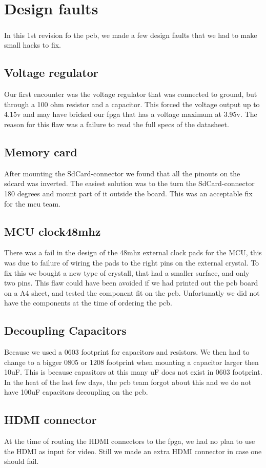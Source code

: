 \section{Design faults}
In this 1\textsuperscript{}st revision fo the pcb, we made a few design faults that we had to make small hacks to fix. 
\subsection{Voltage regulator}
Our first encounter was the voltage regulator that was connected to ground, but through a 100 ohm resistor and a capacitor. This forced the voltage output up to 4.15v and may have bricked our fpga that has a voltage maximum at 3.95v.
The reason for this flaw was a failure to read the full specs of the datasheet.
\subsection{Memory card}
After mounting the SdCard-connector we found that all the pinouts on the sdcard was inverted. The easiest solution was to the turn the SdCard-connector 180 degrees and mount part of it outside the board. This was an acceptable fix for the mcu team. 
\subsection{MCU clock48mhz}
There was a fail in the design of the 48mhz external clock pads for the MCU, this was due to failure of wiring the pads to the right pins on the external crystal. To fix this we bought a new type of crystall, that had a smaller surface, and only two pins. This flaw could have been avoided if we had printed out the pcb board on a A4 sheet, and tested the component fit on the pcb. Unfortunatly we did not have the components at the time of ordering the pcb.
\subsection{Decoupling Capacitors}
Because we used a 0603 footprint for capacitors and resistors. We then had to change to a bigger 0805 or 1208 footprint when mounting a capacitor larger then 10uF. This is because capasitors at this many uF does not exist in 0603 footprint. In the heat of the last few days, the pcb team forgot about this and we do not have 100uF capacitors decoupling on the pcb.
\subsection{HDMI connector}
At the time of routing the HDMI connectors to the fpga, we had no plan to use the HDMI as input for video. Still we made an extra HDMI connector in case one should fail. 
